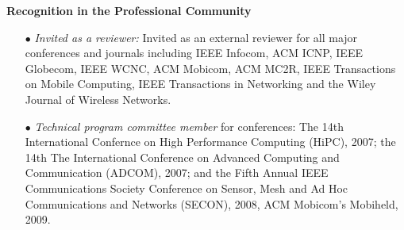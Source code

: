 \begin{resume}
{\bf Recognition in the Professional Community}
    \begin{itemize}
	\item  [$\bullet$] {\em Invited as a reviewer:} Invited as an external
	reviewer for all major conferences and journals including IEEE Infocom,
	ACM ICNP, IEEE Globecom, IEEE WCNC, ACM Mobicom, ACM MC2R, IEEE Transactions on Mobile
	Computing, IEEE Transactions in Networking and the Wiley Journal of Wireless Networks.
        \item [$\bullet$] {\em Technical program committee member} for
	conferences: The 14th International Confernce on High Performance
	Computing (HiPC), 2007; the 14th The International Conference on
	Advanced Computing and Communication (ADCOM), 2007; and the Fifth Annual
	IEEE Communications Society Conference on Sensor, Mesh and Ad Hoc
	Communications and Networks (SECON), 2008, ACM Mobicom's Mobiheld, 2009.
     \end{itemize}
\iffalse
         \item[]  International Conference on Network Protocols (ICNP) 2001.
         \item[]  IEEE Infocom 2003, 2005.
         \item[]  IEEE Globecom 2003.
         \item[]  IEEE Wireless Communications and Networking Conference (WCNC) 2004.
         \item[]  Wireless Communications and Mobile Computing Journal, John Wiley and Sons.
         \item[]  ACM MOBICOM Mobile and Computer Communications Review (MC2R).
	 \item[]  EURASIP Journal of Wireless Communications.
	 \item[]  IEEE Transactions on Mobile Computing.
         \item[]  Wiley Journal on Wireless Networks.
    \end{itemize}
\fi


\end{resume}































